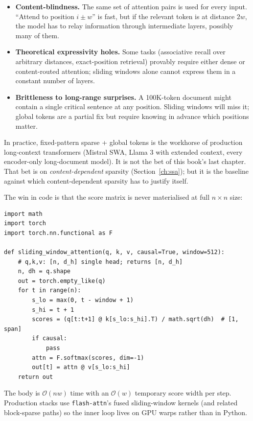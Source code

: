 \begin{itemize}
\item \textbf{Content-blindness.} The same set of attention pairs is used
for every input. ``Attend to position \(i \pm w\)'' is fast, but if the
relevant token is at distance \(2w\), the model has to relay information
through intermediate layers, possibly many of them.
\item \textbf{Theoretical expressivity holes.} Some tasks (associative
recall over arbitrary distances, exact-position retrieval) provably
require either dense or content-routed attention; sliding windows alone
cannot express them in a constant number of layers.
\item \textbf{Brittleness to long-range surprises.} A 100K-token document
might contain a single critical sentence at any position. Sliding windows
will miss it; global tokens are a partial fix but require knowing in
advance which positions matter.
\end{itemize}

In practice, fixed-pattern sparse + global tokens is the workhorse of
production long-context transformers (Mistral SWA, Llama 3 with extended
context, every encoder-only long-document model). It is not the bet of
this book's last chapter. That bet is on \emph{content-dependent}
sparsity (Section~\ref{ch:ssa}); but it is the baseline against which
content-dependent sparsity has to justify itself.

The win in code is that the score matrix is never materialised at full
\(n \times n\) size:

\begin{lstlisting}[caption={Causal sliding-window attention without a full \(n\times n\) score matrix (illustrative \texttt{for} loops).}]
import math
import torch
import torch.nn.functional as F

def sliding_window_attention(q, k, v, causal=True, window=512):
    # q,k,v: [n, d_h] single head; returns [n, d_h]
    n, dh = q.shape
    out = torch.empty_like(q)
    for t in range(n):
        s_lo = max(0, t - window + 1)
        s_hi = t + 1
        scores = (q[t:t+1] @ k[s_lo:s_hi].T) / math.sqrt(dh)  # [1, span]
        if causal:
            pass
        attn = F.softmax(scores, dim=-1)
        out[t] = attn @ v[s_lo:s_hi]
    return out
\end{lstlisting}

\noindent
The body is \(\mathcal{O}(n w)\) time with an \(\mathcal{O}(w)\) temporary
score width per step. Production stacks use \texttt{flash-attn}'s fused
sliding-window kernels (and related block-sparse paths) so the inner loop
lives on GPU warps rather than in Python.

